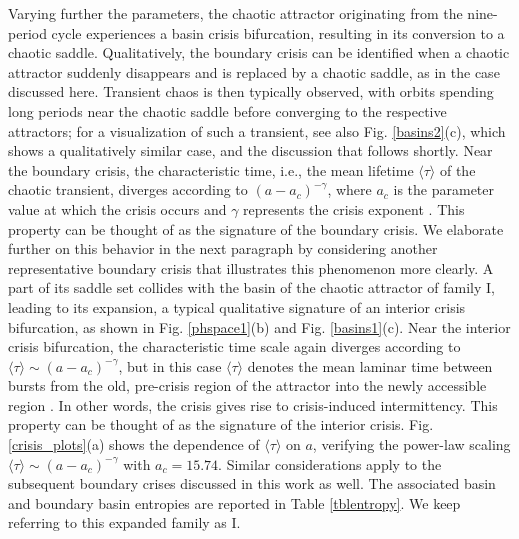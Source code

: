 \documentclass{article}
\theoremstyle{plain}
\theoremstyle{definition}
\begin{document}
    Varying further the parameters, the chaotic attractor originating from the nine-period cycle experiences a basin crisis bifurcation, resulting in its conversion to a chaotic saddle. Qualitatively, the boundary crisis can be identified when a chaotic attractor suddenly disappears and is replaced by a chaotic saddle, as in the case discussed here. Transient chaos is then typically observed, with orbits spending long periods near the chaotic saddle before converging to the respective attractors; for a visualization of such a transient, see also Fig. \ref{basins2}(c), which shows a qualitatively similar case, and the discussion that follows shortly. Near the boundary crisis, the characteristic time, i.e., the mean lifetime $\langle \tau \rangle$ of the chaotic transient, diverges according to $(a-a_c)^{-\gamma}$, where $a_c$ is the parameter value at which the crisis occurs and $\gamma$ represents the crisis exponent \cite{crisis2}. This property can be thought of as the signature of the boundary crisis. We elaborate further on this behavior in the next paragraph by considering another representative boundary crisis that illustrates this phenomenon more clearly. A part of its saddle set collides with the basin of the chaotic attractor of family I, leading to its expansion, a typical qualitative signature of an interior crisis bifurcation, as shown in Fig. \ref{phspace1}(b) and Fig. \ref{basins1}(c). Near the interior crisis bifurcation, the characteristic time scale again diverges according to $\langle \tau \rangle \sim (a-a_c)^{-\gamma}$, but in this case $\langle \tau \rangle$ denotes the mean laminar time between bursts from the old, pre-crisis region of the attractor into the newly accessible region \cite{crisis2}. In other words, the crisis gives rise to crisis-induced intermittency. This property can be thought of as the signature of the interior crisis. Fig. \ref{crisis_plots}(a) shows the dependence of $\langle \tau \rangle$ on $a$, verifying the power-law scaling $\langle \tau \rangle \sim (a-a_c)^{-\gamma}$ with $a_c=15.74$. Similar considerations apply to the subsequent boundary crises discussed in this work as well. The associated basin and boundary basin entropies are reported in Table \ref{tblentropy}. We keep referring to this expanded family as I. 
\end{document}
